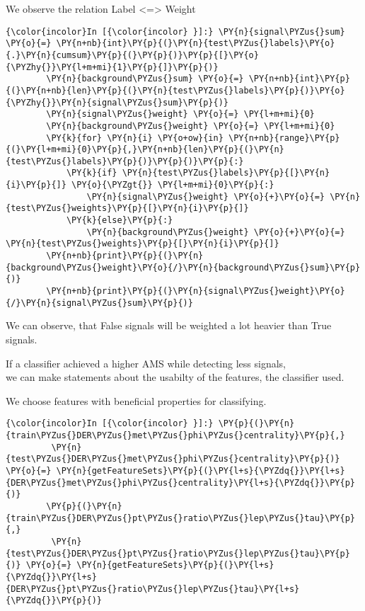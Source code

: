     We observe the relation Label \textless{}=\textgreater{} Weight

    \begin{Verbatim}[commandchars=\\\{\}]
{\color{incolor}In [{\color{incolor} }]:} \PY{n}{signal\PYZus{}sum} \PY{o}{=} \PY{n+nb}{int}\PY{p}{(}\PY{n}{test\PYZus{}labels}\PY{o}{.}\PY{n}{cumsum}\PY{p}{(}\PY{p}{)}\PY{p}{[}\PY{o}{\PYZhy{}}\PY{l+m+mi}{1}\PY{p}{]}\PY{p}{)}
        \PY{n}{background\PYZus{}sum} \PY{o}{=} \PY{n+nb}{int}\PY{p}{(}\PY{n+nb}{len}\PY{p}{(}\PY{n}{test\PYZus{}labels}\PY{p}{)}\PY{o}{\PYZhy{}}\PY{n}{signal\PYZus{}sum}\PY{p}{)}
        \PY{n}{signal\PYZus{}weight} \PY{o}{=} \PY{l+m+mi}{0}
        \PY{n}{background\PYZus{}weight} \PY{o}{=} \PY{l+m+mi}{0}
        \PY{k}{for} \PY{n}{i} \PY{o+ow}{in} \PY{n+nb}{range}\PY{p}{(}\PY{l+m+mi}{0}\PY{p}{,}\PY{n+nb}{len}\PY{p}{(}\PY{n}{test\PYZus{}labels}\PY{p}{)}\PY{p}{)}\PY{p}{:}
            \PY{k}{if} \PY{n}{test\PYZus{}labels}\PY{p}{[}\PY{n}{i}\PY{p}{]} \PY{o}{\PYZgt{}} \PY{l+m+mi}{0}\PY{p}{:}
                \PY{n}{signal\PYZus{}weight} \PY{o}{+}\PY{o}{=} \PY{n}{test\PYZus{}weights}\PY{p}{[}\PY{n}{i}\PY{p}{]}
            \PY{k}{else}\PY{p}{:}
                \PY{n}{background\PYZus{}weight} \PY{o}{+}\PY{o}{=} \PY{n}{test\PYZus{}weights}\PY{p}{[}\PY{n}{i}\PY{p}{]}
        \PY{n+nb}{print}\PY{p}{(}\PY{n}{background\PYZus{}weight}\PY{o}{/}\PY{n}{background\PYZus{}sum}\PY{p}{)}
        \PY{n+nb}{print}\PY{p}{(}\PY{n}{signal\PYZus{}weight}\PY{o}{/}\PY{n}{signal\PYZus{}sum}\PY{p}{)}
\end{Verbatim}

    We can observe, that False signals will be weighted a lot heavier than
True signals.

If a classifier achieved a higher AMS while detecting less signals,\\
we can make statements about the usabilty of the features, the
classifier used.

We choose features with beneficial properties for classifying.

    \begin{Verbatim}[commandchars=\\\{\}]
{\color{incolor}In [{\color{incolor} }]:} \PY{p}{(}\PY{n}{train\PYZus{}DER\PYZus{}met\PYZus{}phi\PYZus{}centrality}\PY{p}{,}
         \PY{n}{test\PYZus{}DER\PYZus{}met\PYZus{}phi\PYZus{}centrality}\PY{p}{)} \PY{o}{=} \PY{n}{getFeatureSets}\PY{p}{(}\PY{l+s}{\PYZdq{}}\PY{l+s}{DER\PYZus{}met\PYZus{}phi\PYZus{}centrality}\PY{l+s}{\PYZdq{}}\PY{p}{)}
        \PY{p}{(}\PY{n}{train\PYZus{}DER\PYZus{}pt\PYZus{}ratio\PYZus{}lep\PYZus{}tau}\PY{p}{,}
         \PY{n}{test\PYZus{}DER\PYZus{}pt\PYZus{}ratio\PYZus{}lep\PYZus{}tau}\PY{p}{)} \PY{o}{=} \PY{n}{getFeatureSets}\PY{p}{(}\PY{l+s}{\PYZdq{}}\PY{l+s}{DER\PYZus{}pt\PYZus{}ratio\PYZus{}lep\PYZus{}tau}\PY{l+s}{\PYZdq{}}\PY{p}{)}
\end{Verbatim}

